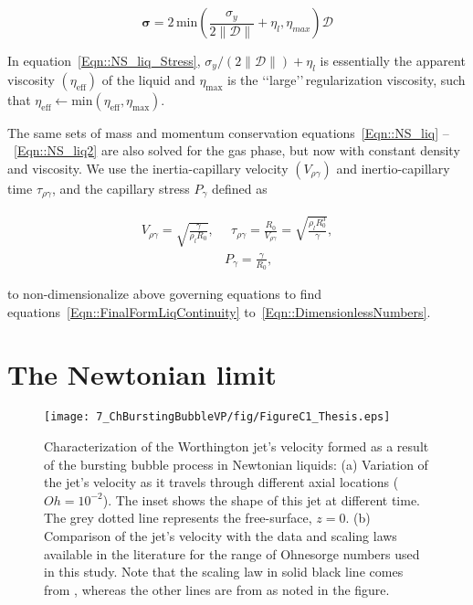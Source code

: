 \begin{subappendices}
\begin{equation}\label{Eqn::NS_liq_Stress}
	\boldsymbol{\sigma} = 2\,\mathrm{min}\left(\frac{\sigma_y}{2\|\boldsymbol{\mathcal{D}}\|} + \eta_l , \eta_{max}\right) \boldsymbol{\mathcal{D}}
\end{equation}

In equation~\eqref{Eqn::NS_liq_Stress}, $\sigma_y/\left(2\|\boldsymbol{\mathcal{D}}\|\right) + \eta_l$ is essentially the apparent viscosity $\left(\eta_{\text{eff}}\right)$ of the liquid and $\eta_{\text{max}}$ is the \lq\lq large\rq\rq\,regularization viscosity, such that $\eta_{\text{eff}} \gets \text{min}\left(\eta_{\text{eff}}, \eta_{\text{max}}\right)$. 

The same sets of mass and momentum conservation equations~\eqref{Eqn::NS_liq} --~\eqref{Eqn::NS_liq2} are also solved for the gas phase, but now with constant density and viscosity. We use the inertia-capillary velocity $\left(V_{\rho\gamma}\right)$ and inertio-capillary time $\tau_{\rho\gamma}$, and the capillary stress $P_{\gamma}$ defined as

\begin{align}\label{Eqn::Scales1}
	V_{\rho\gamma} = \sqrt{\frac{\gamma}{\rho_lR_0}},&\,\,\,\tau_{\rho\gamma} = \frac{R_0}{V_{\rho\gamma}} = \sqrt{\frac{\rho_lR_0^3}{\gamma}},\\
	\label{Eqn::Scales2}
	&P_{\gamma} = \frac{\gamma}{R_0},
\end{align}

\noindent to non-dimensionalize above governing equations to find equations~\eqref{Eqn::FinalFormLiqContinuity} to~\eqref{Eqn::DimensionlessNumbers}.

\section{The Newtonian limit}\label{App::Validation}

\begin{sidewaysfigure}
	\centering
	\texttt{[image: 7\_ChBurstingBubbleVP/fig/FigureC1\_Thesis.eps]}
	\caption{Characterization of the Worthington jet's velocity formed as a result of the bursting bubble process in Newtonian liquids: (a) Variation of the jet's velocity as it travels through different axial locations ($Oh = 10^{-2}$). The inset shows the shape of this jet at different time. The grey dotted line represents the free-surface, $z = 0$. (b) Comparison of the jet's velocity with the data and scaling laws available in the literature for the range of Ohnesorge numbers used in this study. Note that the scaling law in solid black line comes from \citet{deike2018dynamics}, whereas the other lines are from \citet{gordillo2019capillary} as noted in the figure. }
	\label{fig:NewtonianJetVelocity}
\end{sidewaysfigure}


\end{subappendices}

